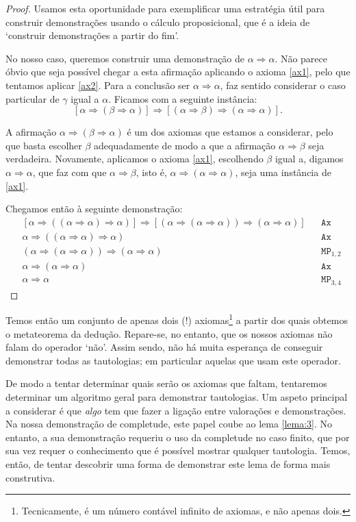 \documentclass{report}
\theoremstyle{definition}
\theoremstyle{remark}
\newcommand{\imply}{\mathbin{\Rightarrow}}
\begin{document}
	\begin{proof}
	Usamos esta oportunidade para exemplificar uma estratégia útil para construir demonstrações usando o cálculo proposicional, que é a ideia de `construir demonstrações a partir do fim'.
	
	No nosso caso, queremos construir uma demonstração de $\alpha \imply \alpha$. Não parece óbvio que seja possível chegar a esta afirmação aplicando o axioma \eqref{ax1}, pelo que tentamos aplicar \eqref{ax2}. Para a conclusão ser $\alpha \imply \alpha$, faz sentido considerar o caso particular de $\gamma$ igual a $\alpha$. Ficamos com a seguinte instância:
	\[[\alpha \imply (\beta \imply \alpha)] \imply [(\alpha \imply \beta) \imply (\alpha \imply \alpha)].\]
	
	A afirmação $\alpha \imply (\beta \imply \alpha)$ é um dos axiomas que estamos a considerar, pelo que basta escolher $\beta$ adequadamente de modo a que a afirmação $\alpha \imply \beta$ seja verdadeira. Novamente, aplicamos o axioma \eqref{ax1}, escolhendo $\beta$ igual a, digamos $\alpha \imply \alpha$, que faz com que $\alpha \imply \beta$, isto é, $\alpha \imply (\alpha \imply \alpha)$, seja uma instância de \eqref{ax1}.
	
	Chegamos então à seguinte demonstração:
	\begin{align*}
	&[\alpha \imply ((\alpha \imply \alpha) \imply \alpha)] \imply [(\alpha \imply (\alpha \imply \alpha)) \imply (\alpha \imply \alpha)]&&\texttt{Ax}\\
	&\alpha \imply ((\alpha \imply \alpha) \imply \alpha)&&\texttt{Ax}\\
	&(\alpha \imply (\alpha \imply \alpha)) \imply (\alpha \imply \alpha)&&\texttt{MP}_{1,2}\\
	&\alpha \imply (\alpha \imply \alpha)&&\texttt{Ax}\\
	&\alpha \imply \alpha&&\texttt{MP}_{3,4}
	\end{align*}
	\end{proof}
	
	Temos então um conjunto de apenas dois (!) axiomas\footnote{Tecnicamente, é um número contável infinito de axiomas, e não apenas dois.} a partir dos quais obtemos o metateorema da dedução. Repare-se, no entanto, que os nossos axiomas não falam do operador `não'. Assim sendo, não há muita esperança de conseguir demonstrar todas as tautologias; em particular aquelas que usam este operador.
	
	De modo a tentar determinar quais serão os axiomas que faltam, tentaremos determinar um algoritmo geral para demonstrar tautologias. Um aspeto principal a considerar é que \emph{algo} tem que fazer a ligação entre valorações e demonstrações. Na nossa demonstração de completude, este papel coube ao lema \ref{lema:3}. No entanto, a sua demonstração requeriu o uso da completude no caso finito, que por sua vez requer o conhecimento que é possível mostrar qualquer tautologia. Temos, então, de tentar descobrir uma forma de demonstrar este lema de forma mais construtiva.
	
\end{document}
